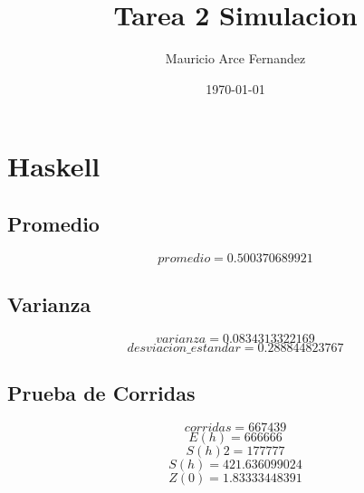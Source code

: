 \documentclass{article}
\title{Tarea 2 Simulacion}
\author{Mauricio Arce Fernandez}
\date{\today}
\begin{document}
\maketitle
\section{Haskell}


\subsection{Promedio}
$$
promedio = 0.500370689921
$$


\subsection{Varianza}
$$
varianza = 0.0834313322169
$$
$$
desviacion\_estandar = 0.288844823767
$$


\subsection{Prueba de Corridas}
$$
corridas = 667439
$$
$$
E(h) = 666666
$$
$$
S(h)2 = 177777
$$
$$
S(h) = 421.636099024
$$
$$
Z(0) = 1.83333448391
$$
\end{document}
